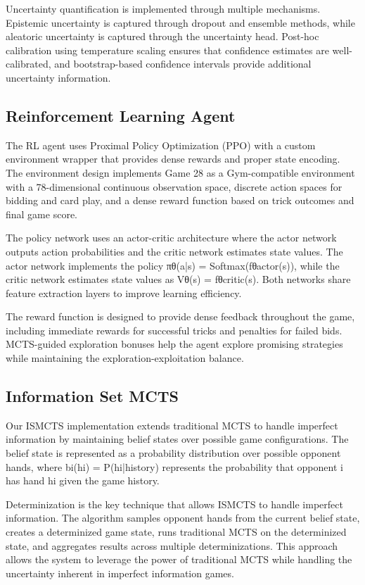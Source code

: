 \documentclass[conference]{IEEEtran}
\begin{document}
Uncertainty quantification is implemented through multiple mechanisms. Epistemic uncertainty is captured through dropout and ensemble methods, while aleatoric uncertainty is captured through the uncertainty head. Post-hoc calibration using temperature scaling ensures that confidence estimates are well-calibrated, and bootstrap-based confidence intervals provide additional uncertainty information.

\subsection{Reinforcement Learning Agent}

The RL agent uses Proximal Policy Optimization (PPO) with a custom environment wrapper that provides dense rewards and proper state encoding. The environment design implements Game 28 as a Gym-compatible environment with a 78-dimensional continuous observation space, discrete action spaces for bidding and card play, and a dense reward function based on trick outcomes and final game score.

The policy network uses an actor-critic architecture where the actor network outputs action probabilities and the critic network estimates state values. The actor network implements the policy πθ(a|s) = Softmax(fθactor(s)), while the critic network estimates state values as Vθ(s) = fθcritic(s). Both networks share feature extraction layers to improve learning efficiency.

The reward function is designed to provide dense feedback throughout the game, including immediate rewards for successful tricks and penalties for failed bids. MCTS-guided exploration bonuses help the agent explore promising strategies while maintaining the exploration-exploitation balance.

\subsection{Information Set MCTS}

Our ISMCTS implementation extends traditional MCTS to handle imperfect information by maintaining belief states over possible game configurations. The belief state is represented as a probability distribution over possible opponent hands, where bi(hi) = P(hi|history) represents the probability that opponent i has hand hi given the game history.

Determinization is the key technique that allows ISMCTS to handle imperfect information. The algorithm samples opponent hands from the current belief state, creates a determinized game state, runs traditional MCTS on the determinized state, and aggregates results across multiple determinizations. This approach allows the system to leverage the power of traditional MCTS while handling the uncertainty inherent in imperfect information games.
\end{document}
